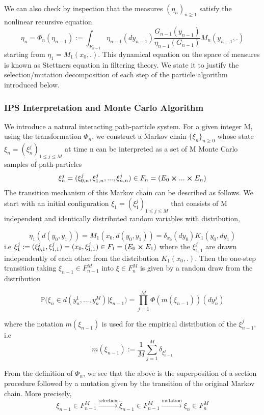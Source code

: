We can also check by inspection that the measures $(\eta_n)_{n\geq 1}$ satisfy the nonlinear recursive equation.
$$\eta_n = \varPhi_n(\eta_{n-1}) := \int_{F_{n-1}} \eta_{n-1}(dy_{n-1}) \frac{G_{n-1}(y_{n-1})}{\eta_{n-1}(G_{n-1})} M_n(y_{n-1},.)$$
starting from $\eta_1 = M_1(x_0,.)$. This dynamical equation on the space of measures is known as Stettners equation in filtering theory. We state it to justify the selection/mutation decomposition of each step of the particle algorithm introduced below.


\subsubsection{IPS Interpretation and Monte Carlo Algorithm}
\label{subsubsec:theory_IPS_MC}
We introduce a natural interacting path-particle system. For a given integer M, using the transformation $\varPhi_n$, we construct a Markov chain $\{\xi_n\}_{n\geq 0}$ whose state $\xi_n = (\xi_n^j)_{1\leq j \leq M}$ at time n can be interpreted as a set of M Monte Carlo samples of path-particles 
$$\xi_n^j = (\xi_{0,n}^j, \xi_{1,n}^j,..., \xi_{n,n}^j) \in F_n = (E_0 \cross ... \cross E_n)$$
The transition mechanism of this Markov chain can be described as follows. We start with an initial configuration $\xi_1 = (\xi_1^j)_{1\leq j \leq M}$ that consists of M independent and identically distributed random variables with distribution,

$$\eta_1(d(y_0,y_1)) = M_1(x_0,d(y_0,y_1)) = \delta_{x_0}(dy_0)K_1(y_0, dy_1) $$
i.e $\xi_1^j := (\xi_{0,1}^j,\xi_{1,1}^j) = (x_0, \xi_{1,1}^j) \in F_1 = (E_0 \cross E_1)$ where the $\xi_{1,1}^j$ are drawn independently of each other from the distribution $K_1(x_0,.)$. Then the one-step transition taking $\xi_{n-1} \in F_{n-1}^M$ into $\xi \in F_n^M$ is given by a random draw from the distribution

\begin{equation}
	\mathbb{P}\big( \xi_n \in d(y_n^1,...,y_n^M)|\xi_{n-1}  \big) = \prod_{j=1}^{M}\varPhi(m(\xi_{n-1}))(dy_n^j)
\end{equation}

where the notation $m(\xi_{n-1})$ is used for the empirical distribution of the $\xi_{n-1}^j$, i.e
$$m(\xi_{n-1}) := \frac{1}{M}\sum_{j=1}^{M}\delta_{\xi_{n-1}^{j}}$$

From the definition of $\varPhi_n$, we see that the above is the superposition of a section procedure followed by a mutation given by the transition of the original Markov chain. More precisely,
$$\xi_{n-1} \in F_{n-1}^{M}  \xrightarrow{\text{selection}} \hat{\xi}_{n-1} \in F_{n-1}^M \xrightarrow{\text{mutation}} \xi_n \in F_n^M$$

